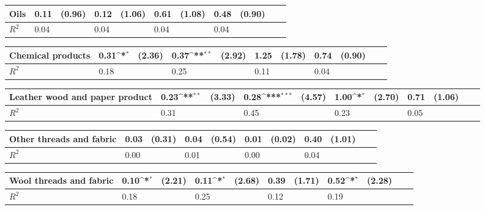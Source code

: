 \def\sym#1{\ifmmode^{#1}\else\(^{#1}\)\fi}
\begin{tabular}{p{4cm} p{1.4cm} p{1.2cm} p{1.5cm}  p{1.5cm} p{1.4cm} p{1.2cm} p{1.5cm} p{1.5cm}  p{1.5cm} p{1.5cm} }
\hline
Oils            &     0.11         &   (0.96)&     0.12         &   (1.06)&     0.61         &   (1.08)&     0.48         &   (0.90)\\
\hline
\(R^{2}\)       &     0.04         &         &     0.04         &         &     0.04         &         &     0.04         &         \\
\end{tabular}
\def\sym#1{\ifmmode^{#1}\else\(^{#1}\)\fi}
\begin{tabular}{p{4cm} p{1.4cm} p{1.2cm} p{1.5cm}  p{1.5cm} p{1.4cm} p{1.2cm} p{1.5cm} p{1.5cm}  p{1.5cm} p{1.5cm} }
\hline
Chemical products&     0.31\sym{*}  &   (2.36)&     0.37\sym{**} &   (2.92)&     1.25         &   (1.78)&     0.74         &   (0.90)\\
\hline
\(R^{2}\)       &     0.18         &         &     0.25         &         &     0.11         &         &     0.04         &         \\
\end{tabular}
\def\sym#1{\ifmmode^{#1}\else\(^{#1}\)\fi}
\begin{tabular}{p{4cm} p{1.4cm} p{1.2cm} p{1.5cm}  p{1.5cm} p{1.4cm} p{1.2cm} p{1.5cm} p{1.5cm}  p{1.5cm} p{1.5cm} }
\hline
Leather wood and paper product&     0.23\sym{**} &   (3.33)&     0.28\sym{***}&   (4.57)&     1.00\sym{*}  &   (2.70)&     0.71         &   (1.06)\\
\hline
\(R^{2}\)       &     0.31         &         &     0.45         &         &     0.23         &         &     0.05         &         \\
\end{tabular}
\def\sym#1{\ifmmode^{#1}\else\(^{#1}\)\fi}
\begin{tabular}{p{4cm} p{1.4cm} p{1.2cm} p{1.5cm}  p{1.5cm} p{1.4cm} p{1.2cm} p{1.5cm} p{1.5cm}  p{1.5cm} p{1.5cm} }
\hline
Other threads and fabric&     0.03         &   (0.31)&     0.04         &   (0.54)&     0.01         &   (0.02)&     0.40         &   (1.01)\\
\hline
\(R^{2}\)       &     0.00         &         &     0.01         &         &     0.00         &         &     0.04         &         \\
\end{tabular}
\def\sym#1{\ifmmode^{#1}\else\(^{#1}\)\fi}
\begin{tabular}{p{4cm} p{1.4cm} p{1.2cm} p{1.5cm}  p{1.5cm} p{1.4cm} p{1.2cm} p{1.5cm} p{1.5cm}  p{1.5cm} p{1.5cm} }
\hline
Wool threads and fabric&     0.10\sym{*}  &   (2.21)&     0.11\sym{*}  &   (2.68)&     0.39         &   (1.71)&     0.52\sym{*}  &   (2.28)\\
\hline
\(R^{2}\)       &     0.18         &         &     0.25         &         &     0.12         &         &     0.19         &         \\
\end{tabular}
